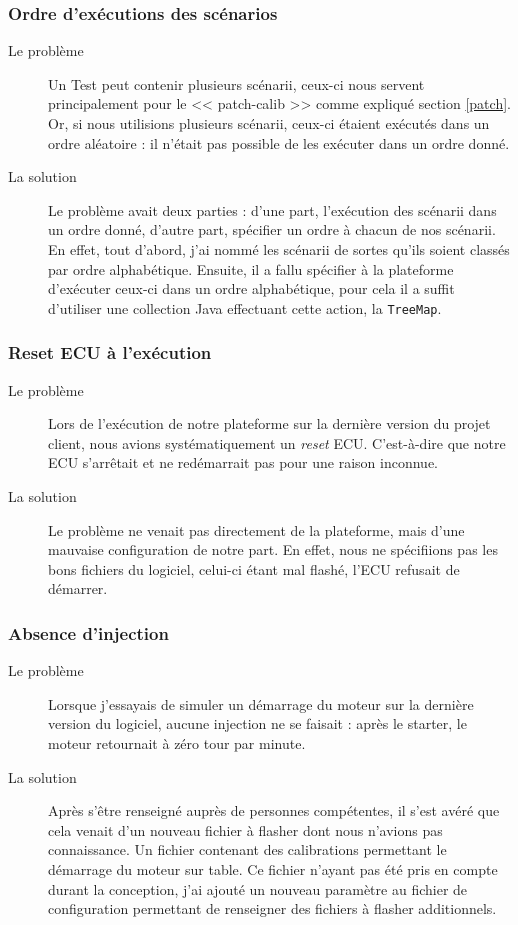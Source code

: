	\subsubsection{Ordre d'exécutions des scénarios}
		\begin{description}
			\item[Le problème] Un Test peut contenir plusieurs scénarii, ceux-ci nous servent principalement pour le << patch-calib >> comme expliqué section \ref{patch}. Or, si nous utilisions plusieurs scénarii, ceux-ci étaient exécutés dans un ordre aléatoire : il n'était pas possible de les exécuter dans un ordre donné.
			\item[La solution] Le problème avait deux parties : d'une part, l'exécution des scénarii dans un ordre donné, d'autre part, spécifier un ordre à chacun de nos scénarii. En effet, tout d'abord, j'ai nommé les scénarii de sortes qu'ils soient classés par ordre alphabétique. Ensuite, il a fallu spécifier à la plateforme d'exécuter ceux-ci dans un ordre alphabétique, pour cela il a suffit d'utiliser une collection Java effectuant cette action, la \texttt{TreeMap}.
	\end{description}
	
	\subsubsection{Reset ECU à l'exécution}
	\begin{description}
		\item[Le problème] Lors de l'exécution de notre plateforme sur la dernière version du projet client, nous avions systématiquement un \textit{reset} ECU. C'est-à-dire que notre ECU s'arrêtait et ne redémarrait pas pour une raison inconnue.
		\item[La solution] Le problème ne venait pas directement de la plateforme, mais d'une mauvaise configuration de notre part. En effet, nous ne spécifiions pas les bons fichiers du logiciel, celui-ci étant mal flashé, l'ECU refusait de démarrer.
	\end{description}
	
	\subsubsection{Absence d'injection}
	\begin{description}
		\item[Le problème] Lorsque j'essayais de simuler un démarrage du moteur sur la dernière version du logiciel, aucune injection ne se faisait : après le starter, le moteur retournait à zéro tour par minute.
		\item[La solution] Après s'être renseigné auprès de personnes compétentes, il s'est avéré que cela venait d'un nouveau fichier à flasher dont nous n'avions pas connaissance. Un fichier contenant des calibrations permettant le démarrage du moteur sur table. Ce fichier n'ayant pas été pris en compte durant la conception, j'ai ajouté un nouveau paramètre au fichier de configuration permettant de renseigner des fichiers à flasher additionnels.
	\end{description}
	
